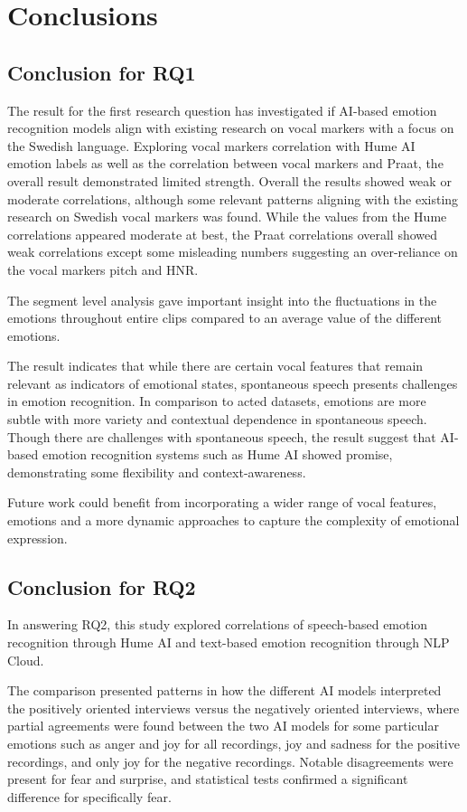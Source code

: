 \section{Conclusions}
\subsection{Conclusion for RQ1}
The result for the first research question has investigated if AI-based emotion recognition models align with existing research on vocal markers with a focus on the Swedish language.
Exploring vocal markers correlation with Hume AI emotion labels as well as the correlation between vocal markers and Praat, the overall result demonstrated limited strength.
Overall the results showed weak or moderate correlations, although some relevant patterns aligning with the existing research on Swedish vocal markers \autocite{Ekberg2023} was found.
While the values from the Hume correlations appeared moderate at best, the Praat correlations overall showed weak correlations except some misleading numbers suggesting an over-reliance on the vocal markers pitch and HNR.

The segment level analysis gave important insight into the fluctuations in the emotions throughout entire clips compared to an average value of the different emotions.

The result indicates that while there are certain vocal features that remain relevant as indicators of emotional states, spontaneous speech presents challenges in emotion recognition. In comparison to acted datasets, emotions are more subtle with more variety and contextual dependence in spontaneous speech.
Though there are challenges with spontaneous speech, the result suggest that AI-based emotion recognition systems such as Hume AI showed promise, demonstrating some flexibility and context-awareness.

Future work could benefit from incorporating a wider range of vocal features, emotions and a more dynamic approaches to capture the complexity of emotional expression.

\subsection{Conclusion for RQ2}
In answering RQ2, this study explored correlations of speech-based emotion recognition through Hume AI and text-based emotion recognition through NLP Cloud. 

The comparison presented patterns in how the different AI models interpreted the positively oriented interviews versus the negatively oriented interviews, where partial agreements were found between the two AI models for some particular emotions such as anger and joy for all recordings, joy and sadness for the positive recordings, and only joy for the negative recordings. Notable disagreements were present for fear and surprise, and statistical tests confirmed a significant difference for specifically fear.

